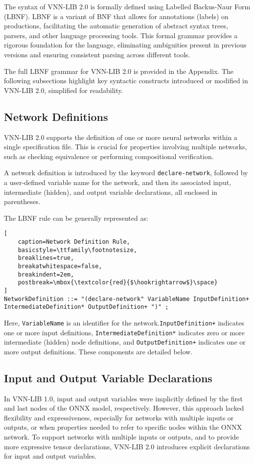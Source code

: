 The syntax of VNN-LIB 2.0 is formally defined using Labelled Backus-Naur Form (LBNF)\cite{8}. LBNF is a variant of BNF that allows for 
annotations (labels) on productions, facilitating the automatic generation of abstract syntax trees, parsers, and other language processing tools. 
This formal grammar provides a rigorous foundation for the language, eliminating ambiguities present in previous versions and ensuring consistent 
parsing across different tools.

The full LBNF grammar for VNN-LIB 2.0 is provided in the Appendix. The following subsections highlight key syntactic constructs introduced 
or modified in VNN-LIB 2.0, simplified for readability.

\subsection{Network Definitions}
VNN-LIB 2.0 supports the definition of one or more neural networks within a single specification file. This is crucial for properties involving 
multiple networks, such as checking equivalence or performing compositional verification.

A network definition is introduced by the keyword \texttt{declare-network}, followed by a user-defined variable name for the network, and then its 
associated input, intermediate (hidden), and output variable declarations, all enclosed in parentheses.

The LBNF rule can be generally represented as:
\begin{lstlisting}[
    caption=Network Definition Rule, 
    basicstyle=\ttfamily\footnotesize,
    breaklines=true,               
    breakatwhitespace=false,       
    breakindent=2em,                
    postbreak=\mbox{\textcolor{red}{$\hookrightarrow$}\space} 
]
NetworkDefinition ::= "(declare-network" VariableName InputDefinition+ IntermediateDefinition* OutputDefinition+ ")" ;
\end{lstlisting}
Here, \texttt{VariableName} is an identifier for the network.\texttt{InputDefinition+} indicates one or more input definitions, \texttt{IntermediateDefinition*} 
indicates zero or more intermediate (hidden) node definitions, and \texttt{OutputDefinition+} indicates one or more output definitions. These components are detailed below.

\subsection{Input and Output Variable Declarations}
In VNN-LIB 1.0, input and output variables were implicitly defined by the first and last nodes of the ONNX model, respectively. However, this approach lacked flexibility and expressiveness,
especially for networks with multiple inputs or outputs, or when properties needed to refer to specific nodes within the ONNX network. To support networks with multiple inputs or outputs, 
and to provide more expressive tensor declarations, VNN-LIB 2.0 introduces explicit declarations for input and output variables.

